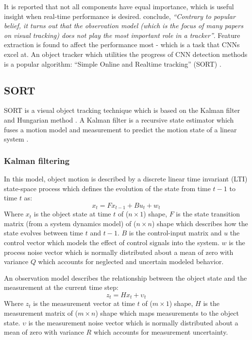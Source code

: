 \documentclass[a4paper,twoside,12pt]{report}
\begin{document}
It is reported that not all components have equal importance, which is useful insight when real-time performance is desired. \cite{diagnosingtrack} conclude, \textit{``Contrary to popular belief, it turns out that the observation model (which is the focus of many papers on visual tracking) does not play the most important role in a tracker''}. Feature extraction is found to affect the performance most - which is a task that CNNs excel at. An object tracker which utilities the progress of CNN detection methods is a popular algorithm: ``Simple Online and Realtime tracking'' (SORT) \citep{sort}.

\subsection{SORT}

SORT is a visual object tracking technique which is based on the Kalman filter \citep{kalman} and Hungarian method \citep{hungarian}. A Kalman filter is a recursive state estimator which fuses a motion model and measurement to predict the motion state of a linear system \citep{trackbook}. 

\subsubsection{Kalman filtering}

In this model, object motion is described by a discrete linear time invariant (LTI) state-space process which defines the evolution of the state from time $t-1$ to time $t$ as:
\begin{equation} 
x_t=Fx_{t-1}+Bu_{t}+w_{t}
\end{equation}
Where $x_{t}$ is the object state at time $t$ of ($n \times 1$) shape, $F$ is the state transition matrix (from a system dynamics model) of ($n \times n$) shape which describes how the state evolves between time $t$ and $t-1$. $B$ is the control-input matrix and $u$ the control vector which models the effect of control signals into the system. $w$ is the process noise vector which is normally distributed about a mean of zero with variance $Q$ which accounts for neglected and uncertain modeled behavior.

An observation model describes the relationship between the object state and the measurement at the current time step:
\begin{equation} 
z_t=Hx_{t}+{\upsilon}_t
\end{equation}
Where $z_{t}$ is the measurement vector at time $t$ of ($m \times 1$) shape, $H$ is the measurement matrix of ($m \times n$) shape which maps measurements to the object state. $\upsilon$ is the measurement noise vector which is normally distributed about a mean of zero with variance $R$ which accounts for measurement uncertainty.
\end{document}
